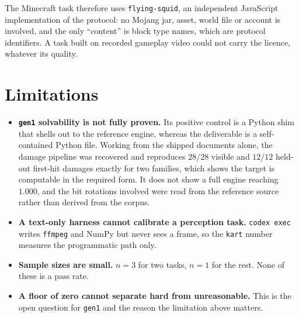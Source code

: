 \documentclass[11pt,a4paper]{article}
\newcommand{\task}[1]{\texttt{#1}}
\begin{document}
The Minecraft task therefore uses \texttt{flying-squid}, an independent JavaScript
implementation of the protocol: no Mojang jar, asset, world file or account is
involved, and the only ``content'' is block type names, which are protocol
identifiers. A task built on recorded gameplay video could not carry the licence,
whatever its quality.

\section{Limitations}

\begin{itemize}
\item \textbf{\task{gen1} solvability is not fully proven.} Its positive control is a
Python shim that shells out to the reference engine, whereas the deliverable is a
self-contained Python file. Working from the shipped documents alone, the damage
pipeline was recovered and reproduces $28/28$ visible and $12/12$ held-out first-hit
damages exactly for two families, which shows the target is computable in the
required form. It does not show a full engine reaching $1.000$, and the bit
rotations involved were read from the reference source rather than derived from the
corpus.
\item \textbf{A text-only harness cannot calibrate a perception task.}
\texttt{codex exec} writes \texttt{ffmpeg} and NumPy but never sees a frame, so the
\task{kart} number measures the programmatic path only.
\item \textbf{Sample sizes are small.} $n{=}3$ for two tasks, $n{=}1$ for the rest.
None of these is a pass rate.
\item \textbf{A floor of zero cannot separate hard from unreasonable.} This is the
open question for \task{gen1} and the reason the limitation above matters.
\end{itemize}
\end{document}
